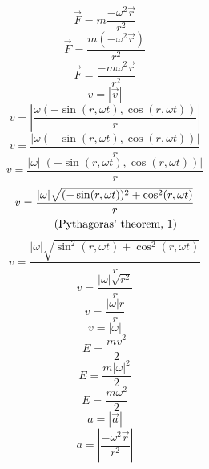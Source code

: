 \documentclass[a4paper,12pt]{report}
\newcommand{\equationnote}[1]{%
    \refstepcounter{equation}%
    \tag{#1, \theequation}%
}
\begin{document}
\begin{equation}
\vec{F} = m \frac{-\omega^2 \vec{r}}{r^2}
\end{equation}
\begin{equation}
\vec{F} = \frac{m (-\omega^2 \vec{r})}{r^2}
\end{equation}
\begin{equation}
\vec{F} = \frac{-m \omega^2 \vec{r}}{r^2}
\end{equation}
\begin{equation}
v = |\vec{v}|
\end{equation}
\begin{equation}
v = \left|\frac{\omega (-\sin(r,\omega t),\cos(r,\omega t))}{r}\right|
\end{equation}
\begin{equation}
v = \frac{\left|\omega (-\sin(r,\omega t),\cos(r,\omega t))\right|}{r}
\end{equation}
\begin{equation}
v = \frac{\left|\omega\right| |(-\sin(r,\omega t),\cos(r,\omega t))|}{r}
\end{equation}
\begin{gather}
v = \frac{|\omega| \sqrt{(-\sin(r,\omega t))^2 + \cos^2(r,\omega t)}}{r} \notag \\
\equationnote{Pythagoras' theorem}
\end{gather}
\begin{equation}
v = \frac{|\omega| \sqrt{\sin^2(r,\omega t) + \cos^2(r,\omega t)}}{r}
\end{equation}
\begin{equation}
v = \frac{|\omega| \sqrt{r^2}}{r}
\end{equation}
\begin{equation}
v = \frac{|\omega| r}{r}
\end{equation}
\begin{equation}
v = |\omega|
\end{equation}
\begin{equation}
E = \frac{mv^2}{2}
\end{equation}
\begin{equation}
E = \frac{m |\omega|^2}{2}
\end{equation}
\begin{equation}
E = \frac{m \omega^2}{2}
\end{equation}
\begin{equation}
a = |\vec{a}|
\end{equation}
\begin{equation}
a = \left|\frac{-\omega^2 \vec{r}}{r^2}\right|
\end{equation}
\end{document}
